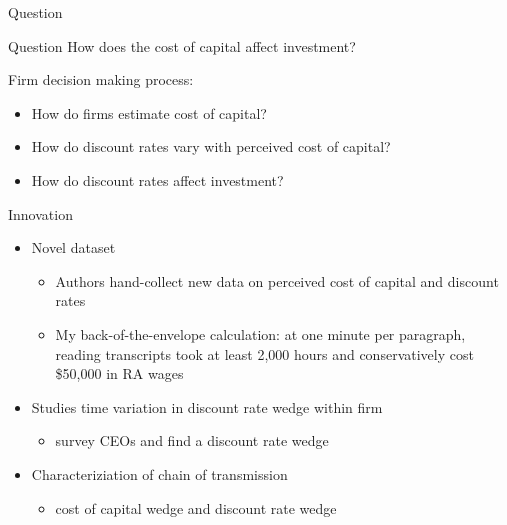 \documentclass[aspectratio=169]{beamer}
\begin{document}
\begin{frame}{Question}


\begin{alertblock}{Question}
    How does the cost of capital affect investment?
\end{alertblock}

Firm decision making process:




\begin{itemize}
    \item How do firms estimate cost of capital?
    \item How do discount rates vary with perceived cost of capital?
    \item How do discount rates affect investment?
\end{itemize}


\end{frame}


\begin{frame}{Innovation}


\begin{itemize}
    \item Novel dataset
    \begin{itemize}
        \item Authors hand-collect new data on perceived cost of capital and discount rates
        \item My back-of-the-envelope calculation: at one minute per paragraph, reading transcripts took at least 2,000 hours and conservatively cost \$50,000 in RA wages
    \end{itemize}
    \item Studies time variation in discount rate wedge within firm
    \begin{itemize}
        \item \citet{poterba-summers-1995} survey CEOs and find a discount rate wedge
    \end{itemize}
    \item Characteriziation of chain of transmission
    \begin{itemize}
        \item cost of capital wedge and discount rate wedge
    \end{itemize}
\end{itemize}
\end{frame}
\end{document}
